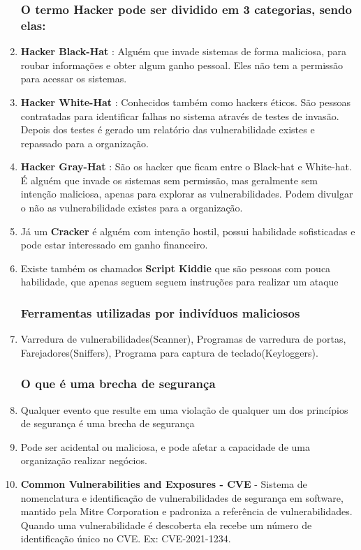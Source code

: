\documentclass{report}
\begin{document}
\begin{enumerate}[label=--]
		\subsubsection{O termo Hacker pode ser dividido em 3 categorias, sendo elas:}
		\item \textbf{Hacker Black-Hat} : Alguém que invade sistemas de forma maliciosa, para roubar informações e obter algum ganho pessoal. Eles não tem a permissão para acessar os sistemas.		
		\item \textbf{Hacker White-Hat} : Conhecidos também como hackers éticos. São pessoas contratadas para identificar falhas no sistema através de testes de invasão. Depois dos testes é gerado um relatório das vulnerabilidade existes e repassado para a organização.
		\item \textbf{Hacker Gray-Hat} : São os hacker que ficam entre o Black-hat e White-hat. É alguém que invade os sistemas sem permissão, mas geralmente sem intenção maliciosa, apenas para explorar as vulnerabilidades. Podem divulgar o não as vulnerabilidade existes para a organização.
		\item Já um \textbf{Cracker} é alguém com intenção hostil, possui habilidade sofisticadas e pode estar interessado em ganho financeiro.
		\item Existe também os chamados \textbf{Script Kiddie} que são pessoas com pouca habilidade, que apenas seguem seguem instruções para realizar um ataque
		
		\subsubsection{Ferramentas utilizadas por indivíduos maliciosos}
		\item Varredura de vulnerabilidades(Scanner), Programas de varredura de portas, Farejadores(Sniffers), Programa para captura de teclado(Keyloggers).
		
		\subsubsection{O que é uma brecha de segurança}
		\item Qualquer evento que resulte em uma violação de qualquer um dos princípios de segurança é uma brecha de segurança
		\item Pode ser acidental ou maliciosa, e pode afetar a capacidade de uma organização realizar negócios.
		\item \textbf{Common Vulnerabilities and Exposures - CVE} - Sistema de nomenclatura e identificação de vulnerabilidades de segurança em software, mantido pela Mitre Corporation e padroniza a referência de vulnerabilidades. Quando uma vulnerabilidade é descoberta ela recebe um número de identificação único no CVE. Ex: CVE-2021-1234.
		

\end{enumerate}
\end{document}
